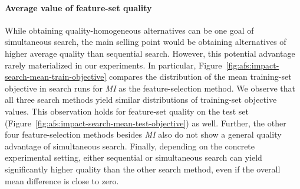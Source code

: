 \documentclass[iicol, sn-basic, Numbered]{sn-jnl} %
\theoremstyle{plain}
\theoremstyle{definition}
\begin{document}
\paragraph{Average value of feature-set quality}

While obtaining quality-homogeneous alternatives can be one goal of simultaneous search, the main selling point would be obtaining alternatives of higher average quality than sequential search.
However, this potential advantage rarely materialized in our experiments.
In particular, Figure~\ref{fig:afs:impact-search-mean-train-objective} compares the distribution of the mean training-set objective in search runs for \emph{MI} as the feature-selection method.
We observe that all three search methods yield similar distributions of training-set objective values.
This observation holds for feature-set quality on the test set (Figure~\ref{fig:afs:impact-search-mean-test-objective}) as well.
Further, the other four feature-selection methods besides \emph{MI} also do not show a general quality advantage of simultaneous search.
Finally, depending on the concrete experimental setting, either sequential or simultaneous search can yield significantly higher quality than the other search method, even if the overall mean difference is close to zero.
\end{document}
